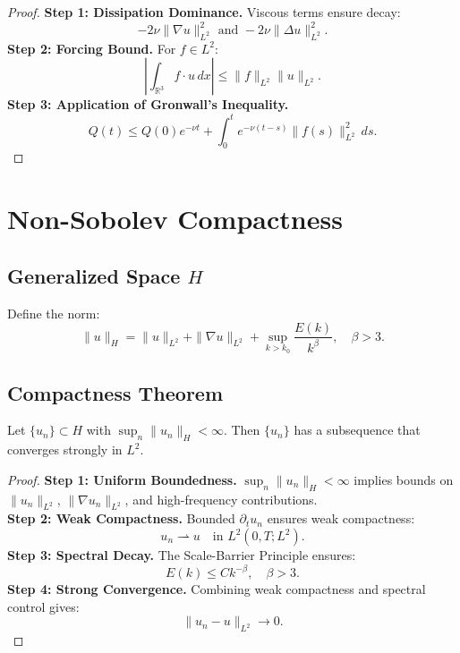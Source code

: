 \documentclass[12pt]{article}
\theoremstyle{definition}
\theoremstyle{remark}
\begin{document}
\begin{proof}
\textbf{Step 1: Dissipation Dominance.} Viscous terms ensure decay:
\begin{equation}
-2\nu \|\nabla u\|_{L^2}^2 \text{ and } -2\nu \|\Delta u\|_{L^2}^2.
\end{equation}
\textbf{Step 2: Forcing Bound.} For $f \in L^2$:
\begin{equation}
\left| \int_{\mathbb{R}^3} f \cdot u \, dx \right| \leq \|f\|_{L^2} \|u\|_{L^2}.
\end{equation}
\textbf{Step 3: Application of Gronwall's Inequality.}
\begin{equation}
Q(t) \leq Q(0)e^{-\nu t} + \int_0^t e^{-\nu (t-s)} \|f(s)\|_{L^2}^2 \, ds.
\end{equation}
\end{proof}

\section{Non-Sobolev Compactness}

\subsection{Generalized Space $H$}
Define the norm:
\begin{equation}
\|u\|_H = \|u\|_{L^2} + \|\nabla u\|_{L^2} + \sup_{k > k_0} \frac{E(k)}{k^\beta}, \quad \beta > 3.
\end{equation}

\subsection{Compactness Theorem}
\begin{theorem}
Let $\{u_n\} \subset H$ with $\sup_n \|u_n\|_H < \infty$. Then $\{u_n\}$ has a subsequence that converges strongly in $L^2$.
\end{theorem}

\begin{proof}
\textbf{Step 1: Uniform Boundedness.} $\sup_n \|u_n\|_H < \infty$ implies bounds on $\|u_n\|_{L^2}$, $\|\nabla u_n\|_{L^2}$, and high-frequency contributions.\\
\textbf{Step 2: Weak Compactness.} Bounded $\partial_t u_n$ ensures weak compactness:
\begin{equation}
u_n \rightharpoonup u \quad \text{in } L^2(0, T; L^2).
\end{equation}
\textbf{Step 3: Spectral Decay.} The Scale-Barrier Principle ensures:
\begin{equation}
E(k) \leq Ck^{-\beta}, \quad \beta > 3.
\end{equation}
\textbf{Step 4: Strong Convergence.} Combining weak compactness and spectral control gives:
\begin{equation}
\|u_n - u\|_{L^2} \to 0.
\end{equation}
\end{proof}
\end{document}
